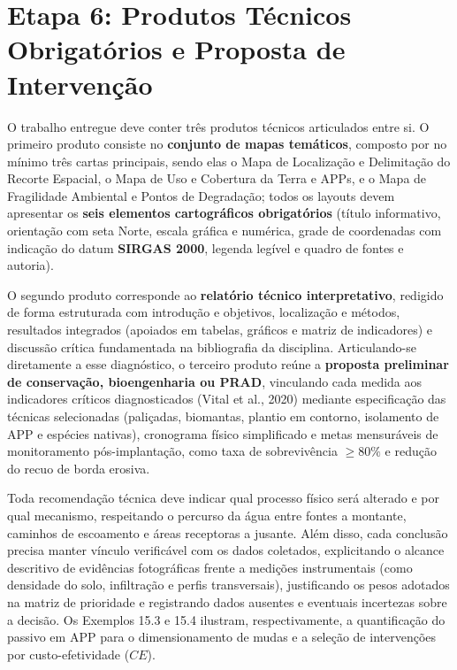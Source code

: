 \section{Etapa 6: Produtos Técnicos Obrigatórios e Proposta de Intervenção}

O trabalho entregue deve conter três produtos técnicos articulados entre si. O primeiro produto consiste no \textbf{conjunto de mapas temáticos}, composto por no mínimo três cartas principais, sendo elas o Mapa de Localização e Delimitação do Recorte Espacial, o Mapa de Uso e Cobertura da Terra e APPs, e o Mapa de Fragilidade Ambiental e Pontos de Degradação; todos os layouts devem apresentar os \textbf{seis elementos cartográficos obrigatórios} (título informativo, orientação com seta Norte, escala gráfica e numérica, grade de coordenadas com indicação do datum \textbf{SIRGAS 2000}, legenda legível e quadro de fontes e autoria).

O segundo produto corresponde ao \textbf{relatório técnico interpretativo}, redigido de forma estruturada com introdução e objetivos, localização e métodos, resultados integrados (apoiados em tabelas, gráficos e matriz de indicadores) e discussão crítica fundamentada na bibliografia da disciplina. Articulando-se diretamente a esse diagnóstico, o terceiro produto reúne a \textbf{proposta preliminar de conservação, bioengenharia ou PRAD}, vinculando cada medida aos indicadores críticos diagnosticados (Vital et al., 2020) mediante especificação das técnicas selecionadas (paliçadas, biomantas, plantio em contorno, isolamento de APP e espécies nativas), cronograma físico simplificado e metas mensuráveis de monitoramento pós-implantação, como taxa de sobrevivência $\ge 80\%$ e redução do recuo de borda erosiva.

Toda recomendação técnica deve indicar qual processo físico será alterado e por qual mecanismo, respeitando o percurso da água entre fontes a montante, caminhos de escoamento e áreas receptoras a jusante. Além disso, cada conclusão precisa manter vínculo verificável com os dados coletados, explicitando o alcance descritivo de evidências fotográficas frente a medições instrumentais (como densidade do solo, infiltração e perfis transversais), justificando os pesos adotados na matriz de prioridade e registrando dados ausentes e eventuais incertezas sobre a decisão. Os Exemplos 15.3 e 15.4 ilustram, respectivamente, a quantificação do passivo em APP para o dimensionamento de mudas e a seleção de intervenções por custo-efetividade ($CE$).

